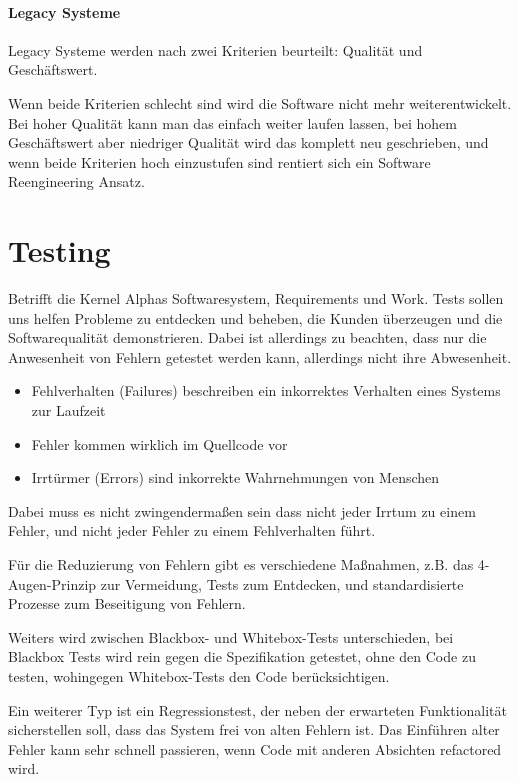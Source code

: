 \subsubsection{Legacy Systeme}
Legacy Systeme werden nach zwei Kriterien beurteilt: Qualität und Geschäftswert.

Wenn beide Kriterien schlecht sind wird die Software nicht mehr weiterentwickelt. Bei hoher Qualität kann man das einfach weiter laufen lassen, bei hohem Geschäftswert aber niedriger Qualität wird das komplett neu geschrieben, und wenn beide Kriterien hoch einzustufen sind rentiert sich ein Software Reengineering Ansatz.

\chapter{Testing}
Betrifft die Kernel Alphas Softwaresystem, Requirements und Work. Tests sollen uns helfen Probleme zu entdecken und beheben, die Kunden überzeugen und die Softwarequalität demonstrieren. Dabei ist allerdings zu beachten, dass nur die Anwesenheit von Fehlern getestet werden kann, allerdings nicht ihre Abwesenheit.

\begin{itemize}
    \item Fehlverhalten (Failures) beschreiben ein inkorrektes Verhalten eines Systems zur Laufzeit
    \item Fehler kommen wirklich im Quellcode vor
    \item Irrtürmer (Errors) sind inkorrekte Wahrnehmungen von Menschen
\end{itemize}

Dabei muss es nicht zwingendermaßen sein dass nicht jeder Irrtum zu einem Fehler, und nicht jeder Fehler zu einem Fehlverhalten führt.

Für die Reduzierung von Fehlern gibt es verschiedene Maßnahmen, z.B. das 4-Augen-Prinzip zur Vermeidung, Tests zum Entdecken, und standardisierte Prozesse zum Beseitigung von Fehlern.

Weiters wird zwischen Blackbox- und Whitebox-Tests unterschieden, bei Blackbox Tests wird rein gegen die Spezifikation getestet, ohne den Code zu testen, wohingegen Whitebox-Tests den Code berücksichtigen.

Ein weiterer Typ ist ein Regressionstest, der neben der erwarteten Funktionalität sicherstellen soll, dass das System frei von alten Fehlern ist. Das Einführen alter Fehler kann sehr schnell passieren, wenn Code mit anderen Absichten refactored wird.

